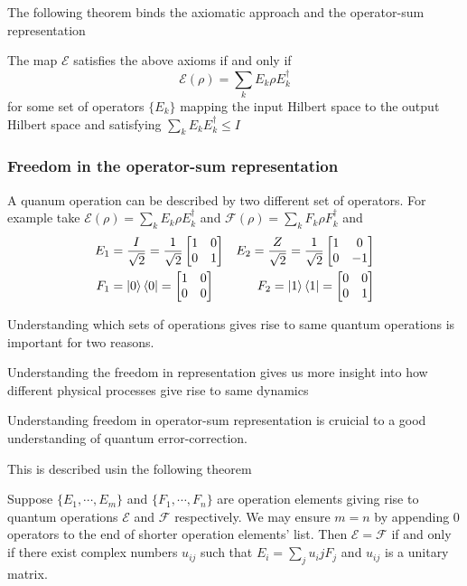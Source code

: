 The following theorem binds the axiomatic approach and the operator-sum representation
\begin{theorem}
    The map $\mathcal{E}$ satisfies the above axioms if and only if
    \begin{equation}
        \mathcal{E}(\rho) = \sum_k  E_k\rho E_k^\dag
    \end{equation}
    for some set of operators $\{ E_k \}$ mapping the input Hilbert space to the output Hilbert space and satisfying $\sum_k E_k E_k^\dag \leq I$
\end{theorem}

\subsubsection{Freedom in the operator-sum representation}
A quanum operation can be described by two different set of operators. For example take $\mathcal{E}(\rho)=\sum_k E_k\rho E_k^\dag$ and $\mathcal{F}(\rho) = \sum_k F_k\rho F_k^\dag$ and
\begin{align}
    E_1 &= \frac{I}{\sqrt{2}} = \frac{1}{\sqrt{2}}\begin{bmatrix}
        1 & 0 \\ 0 & 1
    \end{bmatrix}
    &E_2 = \frac{Z}{\sqrt{2}} = \frac{1}{\sqrt{2}}\begin{bmatrix}
        1 & 0 \\ 0 & -1
    \end{bmatrix}
    \\
    F_1 &= \ket{0}\bra{0} = \begin{bmatrix}
        1 & 0 \\ 0 & 0
    \end{bmatrix}
    &F_2 = \ket{1}\bra{1} = \begin{bmatrix}
        0 & 0 \\ 0 & 1
    \end{bmatrix}
\end{align}

Understanding which sets of operations gives rise to same quantum operations is important for two reasons. \begin{enumerate*}[label=(\alph*)]
    \item Understanding the freedom in representation gives us more insight into how different physical processes give rise to same dynamics
    \item Understanding freedom in operator-sum representation is cruicial to a good understanding of quantum error-correction.
\end{enumerate*}
This is described usin the following theorem
\begin{theorem}
    Suppose $\{ E_1,\cdots, E_m \}$ and $\{ F_1, \cdots, F_n \}$ are operation elements giving rise to quantum operations $\mathcal{E}$ and $\mathcal{F}$ respectively. We may ensure $m=n$ by appending 0 operators to the end of shorter operation elements' list. Then $\mathcal{E}=\mathcal{F}$ if and only if there exist complex numbers $u_{ij}$ such that $E_i = \sum_j u_ij F_j$ and $u_{ij}$ is a unitary matrix.
\end{theorem}

